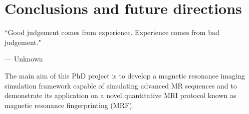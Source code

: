 \chapter{Conclusions and future directions}
\label{chapterlabel4}
\epigraph{``Good judgement comes from experience. Experience comes from bad judgement."}{--- \textup{Unknown}}


The main aim of this PhD project is to develop a magnetic resonance imaging simulation framework capable of simulating advanced MR sequences and to demonstrate its application on a novel quantitative MRI protocol known as magnetic resonance fingerprinting (MRF).







